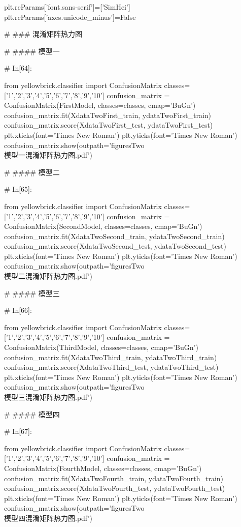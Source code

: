 \documentclass{MathorCupmodeling}
\begin{document}
\begin{python}
plt.rcParams['font.sans-serif']=['SimHei']
plt.rcParams['axes.unicode_minus']=False


# ### 混淆矩阵热力图

# #### 模型一

# In[64]:


from yellowbrick.classifier import ConfusionMatrix
classes=['1','2','3','4','5','6','7','8','9','10']
confusion_matrix = ConfusionMatrix(FirstModel, classes=classes, cmap='BuGn')
confusion_matrix.fit(XdataTwoFirst_train, ydataTwoFirst_train)
confusion_matrix.score(XdataTwoFirst_test, ydataTwoFirst_test)
plt.xticks(font='Times New Roman')
plt.yticks(font='Times New Roman')
confusion_matrix.show(outpath='figuresTwo\\[附件2]模型一混淆矩阵热力图.pdf')


# #### 模型二

# In[65]:


from yellowbrick.classifier import ConfusionMatrix
classes=['1','2','3','4','5','6','7','8','9','10']
confusion_matrix = ConfusionMatrix(SecondModel, classes=classes, cmap='BuGn')
confusion_matrix.fit(XdataTwoSecond_train, ydataTwoSecond_train)
confusion_matrix.score(XdataTwoSecond_test, ydataTwoSecond_test)
plt.xticks(font='Times New Roman')
plt.yticks(font='Times New Roman')
confusion_matrix.show(outpath='figuresTwo\\[附件2]模型二混淆矩阵热力图.pdf')


# #### 模型三

# In[66]:


from yellowbrick.classifier import ConfusionMatrix
classes=['1','2','3','4','5','6','7','8','9','10']
confusion_matrix = ConfusionMatrix(ThirdModel, classes=classes, cmap='BuGn')
confusion_matrix.fit(XdataTwoThird_train, ydataTwoThird_train)
confusion_matrix.score(XdataTwoThird_test, ydataTwoThird_test)
plt.xticks(font='Times New Roman')
plt.yticks(font='Times New Roman')
confusion_matrix.show(outpath='figuresTwo\\[附件2]模型三混淆矩阵热力图.pdf')


# #### 模型四

# In[67]:


from yellowbrick.classifier import ConfusionMatrix
classes=['1','2','3','4','5','6','7','8','9','10']
confusion_matrix = ConfusionMatrix(FourthModel, classes=classes, cmap='BuGn')
confusion_matrix.fit(XdataTwoFourth_train, ydataTwoFourth_train)
confusion_matrix.score(XdataTwoFourth_test, ydataTwoFourth_test)
plt.xticks(font='Times New Roman')
plt.yticks(font='Times New Roman')
confusion_matrix.show(outpath='figuresTwo\\[附件2]模型四混淆矩阵热力图.pdf')



\end{python}
\end{document}
